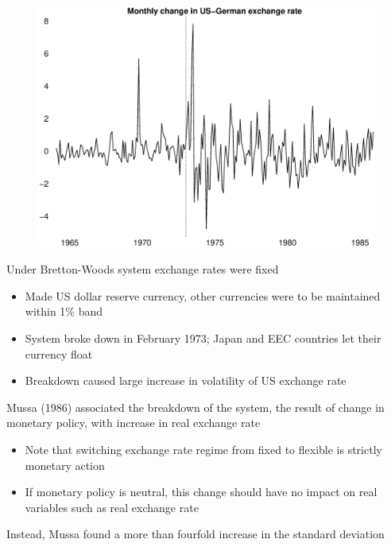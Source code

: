 \documentclass{beamer}
\begin{document}
\begin{frame}
  \begin{figure}
    \includegraphics[scale=.3]{exchange_rate.eps}
  \end{figure}  
\end{frame}

\begin{frame}
  Under Bretton-Woods system exchange rates were fixed
  \begin{itemize}
    \item Made US dollar reserve currency, other currencies were to be maintained within 1\% band
    \item System broke down in February 1973; Japan and EEC countries let their currency float
    \item Breakdown caused large increase in volatility of US exchange rate
  \end{itemize}
  \medskip  
\end{frame}


\begin{frame}
 Mussa (1986) associated the breakdown of the system, the result of change in monetary policy, with increase in real exchange rate
  \begin{itemize}
    \item Note that switching exchange rate regime from fixed to flexible is strictly monetary action
    \item If monetary policy is neutral, this change should have no impact on real variables such as real exchange rate
  \end{itemize}
  \medskip
  Instead, Mussa found a more than fourfold increase in the standard deviation  
\end{frame}



\end{document}
